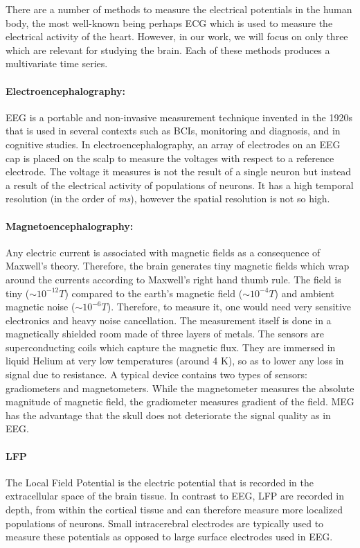 There are a number of methods to measure the electrical potentials in the human body, the most well-known being perhaps \ac{ECG} which is used to measure the electrical activity of the heart. However, in our work, we will focus on only three which are relevant for studying the brain. Each of these methods produces a multivariate time series.

\paragraph{Electroencephalography: } \Ac{EEG} is a portable and non-invasive measurement technique invented in the 1920s that is  used in several contexts such as \acp{BCI}, monitoring and diagnosis, and in cognitive studies. 
In electroencephalography, an array of electrodes on an \ac{EEG} cap is placed on the scalp to measure the voltages with respect to a reference electrode. 
The voltage it measures is not the result of a single neuron but instead a result of the electrical activity of populations of  neurons. It has a high temporal resolution (in the order of \emph{ms}), however the spatial resolution is not so high.

\paragraph{Magnetoencephalography: } Any electric current is associated with magnetic fields as a consequence of Maxwell's theory. 
Therefore, the brain generates tiny magnetic fields which  wrap around the currents according to Maxwell's right hand thumb rule. The field is tiny ($\sim10^{-12}T$) compared to the earth's magnetic field ($\sim10^{-4}T$) and ambient magnetic noise ($\sim10^{-6}T$). Therefore, to measure it, one would need very sensitive electronics and heavy noise cancellation. The measurement itself is done in a magnetically shielded room made of three layers of metals. 
The sensors are superconducting coils which capture the magnetic flux. 
They are immersed in liquid Helium at very low temperatures (around 4 K), so as to lower any loss in signal due to resistance. A typical device contains two types of sensors: gradiometers and magnetometers. While the magnetometer measures the absolute magnitude of magnetic field, the gradiometer measures gradient of the field. \Ac{MEG} has the advantage that the skull does not deteriorate the signal quality as in \ac{EEG}.

\paragraph{\Ac{LFP}}
The Local Field Potential is the electric potential that is recorded in the extracellular space of the brain tissue. In contrast to \ac{EEG}, \ac{LFP} are recorded in depth, from within the cortical tissue and can therefore measure more localized populations of neurons. Small intracerebral electrodes are typically used to measure these potentials as opposed to large surface electrodes used in \ac{EEG}.

